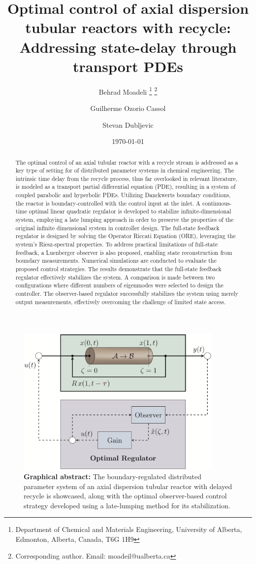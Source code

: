 \documentclass[letterpaper,12pt]{article}
\title{Optimal control of axial dispersion tubular reactors with recycle: Addressing state-delay through transport PDEs}
\author{
  Behrad Moadeli \thanks{Department of Chemical and Materials Engineering, University of Alberta, Edmonton, Alberta, Canada, T6G 1H9} \thanks{Corresponding author. Email: moadeil@ualberta.ca} \and
  Guilherme Ozorio Cassol\footnotemark[1] \and
  Stevan Dubljevic \footnotemark[1] 
  }
\date{\today}
\begin{document}
\maketitle

\begin{figure}[htbp!]
  \centering
  \includegraphics*[width=0.9\textwidth]{Figures/abstract_final.PNG}
  \caption*{\textbf{Graphical abstract:}
  The boundary-regulated distributed parameter system of an axial dispersion tubular reactor with delayed recycle is showcased, along with the optimal observer-based control strategy developed using a late-lumping method for its stabilization.}
\end{figure}

\newpage
\begin{abstract}
  The optimal control of an axial tubular reactor with a recycle stream is addressed as a key type of setting for of distributed parameter systems in chemical engineering. The intrinsic time delay from the recycle process, thus far overlooked in relevant literature, is modeled as a transport partial differential equation (PDE), resulting in a system of coupled parabolic and hyperbolic PDEs. Utilizing Danckwerts boundary conditions, the reactor is boundary-controlled with the control input at the inlet. A continuous-time optimal linear quadratic regulator is developed to stabilize infinite-dimensional system, employing a late lumping approach in order to preserve the properties of the original infinite dimensional system in controller design. The full-state feedback regulator is designed by solving the Operator Riccati Equation (ORE), leveraging the system's Riesz-spectral properties. To address practical limitations of full-state feedback, a Luenberger observer is also proposed, enabling state reconstruction from boundary measurements. 
  Numerical simulations are conducted to evaluate the proposed control strategies. The results demonstrate that the full-state feedback regulator effectively stabilizes the system. A comparison is made between two configurations where different numbers of eigenmodes were selected to design the controller. The observer-based regulator successfully stabilizes the system using merely output measurements, effectively overcoming the challenge of limited state access.
\end{abstract}
\end{document}
